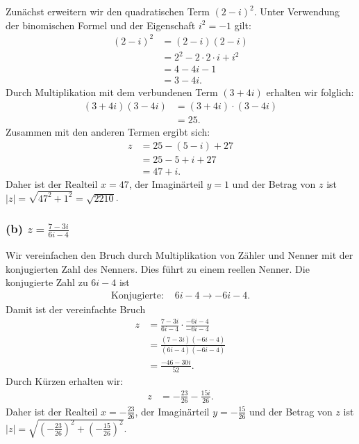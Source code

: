 \documentclass{article}
\theoremstyle{definition}
\theoremstyle{remark}
\begin{document}
Zunächst erweitern wir den quadratischen Term \((2 - i)^{2}\). Unter Verwendung der binomischen Formel und der Eigenschaft \(i^2 = -1\) gilt:
\begin{align*}
    (2 - i)^2 & = (2 - i)(2 - i)                \\
              & = 2^2 - 2 \cdot 2 \cdot i + i^2 \\
              & = 4 - 4i - 1                    \\
              & = 3 - 4i.
\end{align*}
Durch Multiplikation mit dem verbundenen Term \( (3 + 4i) \) erhalten wir folglich:
\begin{align*}
    (3 + 4i)(3 - 4i) & = (3 + 4i) \cdot (3 - 4i) \\
                     & = 25.
\end{align*}
Zusammen mit den anderen Termen ergibt sich:
\begin{align*}
    z & = 25 - (5 - i) + 27 \\
      & = 25 - 5 + i + 27   \\
      & = 47 + i.
\end{align*}
Daher ist der Realteil \( x = 47 \), der Imaginärteil \( y = 1 \) und der Betrag von \( z \) ist \( |z| = \sqrt{47^2 + 1^2} = \sqrt{2210} \).

\subsubsection*{(b) \( z = \frac{7 - 3i}{6i - 4} \)}

Wir vereinfachen den Bruch durch Multiplikation von Zähler und Nenner mit der konjugierten Zahl des Nenners. Dies führt zu einem reellen Nenner. Die konjugierte Zahl zu \( 6i - 4 \) ist
\begin{align*}
    \text{Konjugierte: } & 6i - 4 \rightarrow -6i - 4.
\end{align*}
Damit ist der vereinfachte Bruch
\begin{align*}
    z & = \frac{7 - 3i}{6i - 4} \cdot \frac{-6i - 4}{-6i - 4} \\
      & = \frac{(7 - 3i)(-6i - 4)}{(6i - 4)(-6i - 4)}         \\
      & = \frac{-46 - 30i}{52}.
\end{align*}
Durch Kürzen erhalten wir:
\begin{align*}
    z & = -\frac{23}{26} - \frac{15i}{26}.
\end{align*}
Daher ist der Realteil \( x = -\frac{23}{26} \), der Imaginärteil \( y = -\frac{15}{26} \) und der Betrag von \( z \) ist \( |z| = \sqrt{\left(-\frac{23}{26}\right)^2 + \left(-\frac{15}{26}\right)^2} \).
\end{document}
